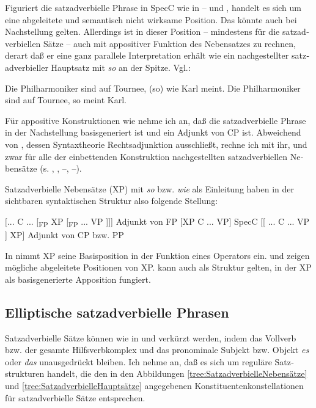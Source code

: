 \documentclass[output=paper, colorlinks, citecolor=brown, booklanguage=german]{langscibook}
\begin{document}
\begin{otherlanguage}{german}
Figuriert die satzadverbielle Phrase in SpecC wie in -- und , handelt es sich um eine abgeleitete und semantisch nicht wirksame Position. Das könnte auch bei Nachstellung gelten. Allerdings ist in dieser Position -- mindestens für die satzadverbiellen Sätze -- auch mit appositiver Funktion des Nebensatzes zu rechnen, derart daß er eine ganz parallele Interpretation erhält wie ein nachgestellter satzadverbieller Hauptsatz mit \textit{so} an der Spitze. Vgl.:

\ea Die Philharmoniker sind auf Tournee, (so) wie Karl meint. \label{ex:zi97:27}
\ex Die Philharmoniker sind auf Tournee, so meint Karl. \label{ex:zi97:28}
\z

\noindent Für appositive Konstruktionen wie  nehme ich an, daß die satzadverbielle Phrase in der Nachstellung basisgeneriert ist und ein Adjunkt von CP ist. Abweichend von \citet{kayne1994antisymmetry}, dessen Syntaxtheorie Rechtsadjunktion ausschließt, rechne ich mit ihr, und zwar für alle der einbettenden Konstruktion nachgestellten satzadverbiellen Nebensätze (s. , , --, --).

Satzadverbielle Nebensätze (XP) mit \textit{so} bzw. \textit{wie} als Einleitung haben in der sichtbaren syntaktischen Struktur also folgende Stellung:

\ea 
    \ea $[$... C ... [\textsubscript{FP} XP [\textsubscript{FP} ... VP ]]] \hfill Adjunkt von FP\label{ex:zi97:29a}
    \ex $[$XP \; C ... VP] \hfill SpecC\label{ex:zi97:29b}
    \ex $[$[ ... C ... VP ] XP] \hfill Adjunkt von CP bzw. PP\label{ex:zi97:29c}
    \z
\z

\noindent In  nimmt XP seine Basisposition in der Funktion eines Operators ein.  und  zeigen mögliche abgeleitete Positionen von XP.  kann auch als Struktur gelten, in der XP als basisgenerierte Apposition fungiert.

\subsection{Elliptische satzadverbielle Phrasen} \label{sec:zi97:2.4}

Satzadverbielle Sätze können wie in  und  verkürzt werden, indem das Vollverb bzw. der gesamte Hilfsverbkomplex und das pronominale Subjekt bzw. Objekt \textit{es} oder \textit{das} unausgedrückt bleiben. Ich nehme an, daß es sich um reguläre Satzstrukturen handelt, die den in den Abbildungen \ref{tree:SatzadverbielleNebensätze} und \ref{tree:SatzadverbielleHauptsätze} angegebenen Konstituentenkonstellationen für satzadverbielle Sätze entsprechen.


\end{otherlanguage}
\end{document}
